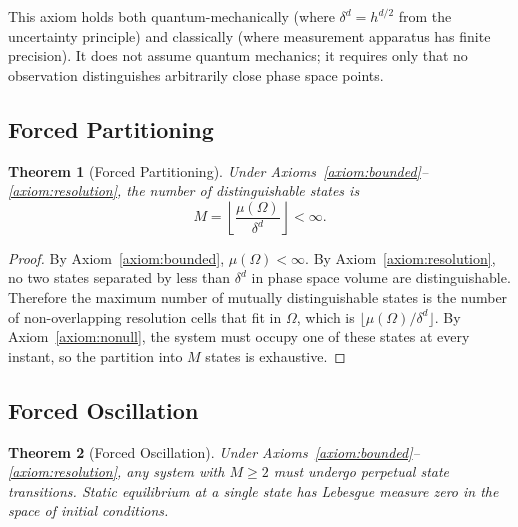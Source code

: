 \documentclass[twocolumn,10pt]{article}
\newtheorem{theorem}{Theorem}[section]
\theoremstyle{remark}
\begin{document}
This axiom holds both quantum-mechanically (where $\delta^d = h^{d/2}$ from the uncertainty principle) and classically (where measurement apparatus has finite precision).
It does not assume quantum mechanics; it requires only that no observation distinguishes arbitrarily close phase space points.

\subsection{Forced Partitioning}

\begin{theorem}[Forced Partitioning]
\label{thm:forced_partitioning}
Under Axioms~\ref{axiom:bounded}--\ref{axiom:resolution}, the number of distinguishable states is
\begin{equation}
M = \left\lfloor \frac{\mu(\Omega)}{\delta^d} \right\rfloor < \infty.
\label{eq:M_def}
\end{equation}
\end{theorem}

\begin{proof}
By Axiom~\ref{axiom:bounded}, $\mu(\Omega) < \infty$.
By Axiom~\ref{axiom:resolution}, no two states separated by less than $\delta^d$ in phase space volume are distinguishable.
Therefore the maximum number of mutually distinguishable states is the number of non-overlapping resolution cells that fit in $\Omega$, which is $\lfloor \mu(\Omega)/\delta^d \rfloor$.
By Axiom~\ref{axiom:nonull}, the system must occupy one of these states at every instant, so the partition into $M$ states is exhaustive.
\end{proof}

\subsection{Forced Oscillation}

\begin{theorem}[Forced Oscillation]
\label{thm:forced_oscillation}
Under Axioms~\ref{axiom:bounded}--\ref{axiom:resolution}, any system with $M \geq 2$ must undergo perpetual state transitions.
Static equilibrium at a single state has Lebesgue measure zero in the space of initial conditions.
\end{theorem}
\end{document}
